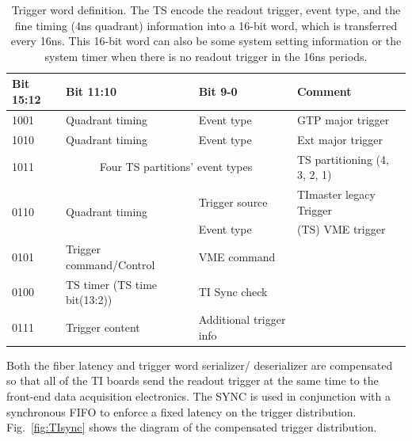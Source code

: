 \begin{table}
\begin{adjustbox}{width=\columnwidth,center}
	\begin{tabular}{| l | l | l | l |}
		\hline \hline
		Bit 15:12		& 	Bit 11:10 &	Bit 9-0	 & Comment		\\
		\hline
	1001	& Quadrant timing	& Event type	 & GTP major trigger \\
	1010	& Quadrant timing	& Event type	 & Ext major trigger \\
	
	1011	& \multicolumn{2}{c}{Four TS partitions’ event types}    & TS partitioning (4, 3, 2, 1) \\

	\multirow{2}{*}{0110}	& \multirow{2}{*}{Quadrant timing}	& Trigger source & TImaster legacy Trigger \\
		    &                   & Event type	 & (TS) VME trigger     \\
	0101	& Trigger command/Control	& VME command \\
	0100	& TS timer (TS time bit(13:2))	& TI Sync check \\
	0111	& Trigger content	& Additional trigger info \\
		\hline \hline
	\end{tabular}
\end{adjustbox}
\caption{Trigger word definition.  The TS encode the readout trigger, event type, and the fine timing (4ns quadrant) information into a 16-bit word, which is transferred every 16ns.  This 16-bit word can also be some system setting information or the system timer when there is no readout trigger in the 16ns periods.}
\label{tab:trigger_word_definition}
\end{table}

Both the fiber latency and trigger word serializer/ deserializer are compensated so that all of the TI boards send the readout trigger at the same time to the front-end data acquisition electronics.  The SYNC is used in conjunction with a synchronous FIFO to enforce a fixed latency on the trigger distribution. Fig.~\ref{fig:TIsync} shows the diagram of the compensated trigger distribution.

